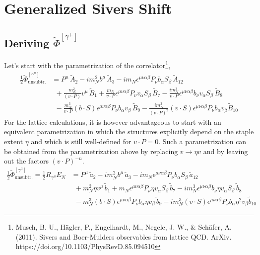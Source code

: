 \documentclass[]{article}
\numberwithin{equation}{section}
\newcommand{\tcdot}{{\cdot}}
\newcommand{\tAmp}{\widetilde{A}}
\newcommand{\tBmp}{\widetilde{B}}
\newcommand{\tAmp}{\ensuremath{\widetilde{A}^{(+)}}}
\newcommand{\tBmp}{\ensuremath{\widetilde{B}^{(+)}}}
\newcommand{\bvec}{b}
\newcommand{\mN}{m_N}
\newcommand{\unsub}{\text{unsubtr.}}
\begin{document}
\section{Generalized Sivers Shift}
\subsection{Deriving $\widetilde \Phi^{[\gamma^+]}$}
Let's start with the parametrization of the correlator\footnote{Musch, B. U., Hägler, P., Engelhardt, M., Negele, J. W., $\&$ Schäfer, A. (2011). Sivers and Boer-Mulders observables from lattice QCD. ArXiv. https://doi.org/10.1103/PhysRevD.85.094510},
\begin{align}
    \frac{1}{2}\widetilde \Phi^{[\gamma^\mu]}_{\unsub} & = 
		P^\mu\, \tAmp_2 - i \mN^2 \bvec^\mu\, \tAmp_3
		- i \mN \epsilon^{\mu \nu \alpha \beta} P_\nu \bvec_\alpha S_\beta\, \tAmp_{12} \nonumber \\ &
		~~+ \frac{\mN^2}{(v \tcdot P)} v^\mu\, \tBmp_1 
		+ \frac{\mN}{v \tcdot P} \epsilon^{\mu \nu \alpha \beta} P_\nu v_\alpha S_\beta\, \tBmp_7  
		- \frac{ i \mN^3}{v \tcdot P} \epsilon^{\mu \nu \alpha \beta} \bvec_\nu v_\alpha S_\beta\, \tBmp_8 \nonumber \\ &
		~~- \frac{\mN^3}{v \tcdot P} (\bvec \tcdot S) \epsilon^{\mu \nu \alpha \beta} P_\nu \bvec_\alpha v_\beta\, \tBmp_9
		- \frac{i \mN^3}{(v \tcdot P)^2} (v \tcdot S) \epsilon^{\mu \nu \alpha \beta} P_\nu \bvec_\alpha v_\beta \tBmp_{10}
\end{align}
 For the lattice calculations, it is however advantageous to start with an equivalent parametrization in which the structures explicitly depend on the staple extent $\eta$ and which is still well-defined for $v \tcdot P = 0$. Such a parametrization can be obtained from the parametrization above by replacing $v \rightarrow \eta v$ and by leaving out the factors $(v \tcdot P)^{-n}$. 
 \begin{align}
    \frac{1}{2}\widetilde \Phi^{[\gamma^\mu]}_{\unsub}=\frac{1}{2} R_{\gamma^{\mu}} E_N & =  
		P^\mu\, \tilde a_2 - i \mN^2 \bvec^\mu\, \tilde a_3
		- i \mN \epsilon^{\mu \nu \alpha \beta} P_\nu \bvec_\alpha S_\beta\, \tilde a_{12} \nonumber \\ &
		~~+ \mN^2 \eta v^\mu\, \tilde b_1 
		+ \mN \epsilon^{\mu \nu \alpha \beta} P_\nu \eta v_\alpha S_\beta\, \tilde b_7  
		-  i \mN^3 \epsilon^{\mu \nu \alpha \beta} \bvec_\nu \eta v_\alpha S_\beta\, \tilde b_8 \nonumber \\ &
		~~- \mN^3 (\bvec \tcdot S) \epsilon^{\mu \nu \alpha \beta} P_\nu \bvec_\alpha \eta v_\beta\, \tilde b_9
		-i \mN^3 (v \tcdot S) \epsilon^{\mu \nu \alpha \beta} P_\nu \bvec_\alpha \eta^2 v_\beta \tilde b_{10}
\end{align}
\end{document}
